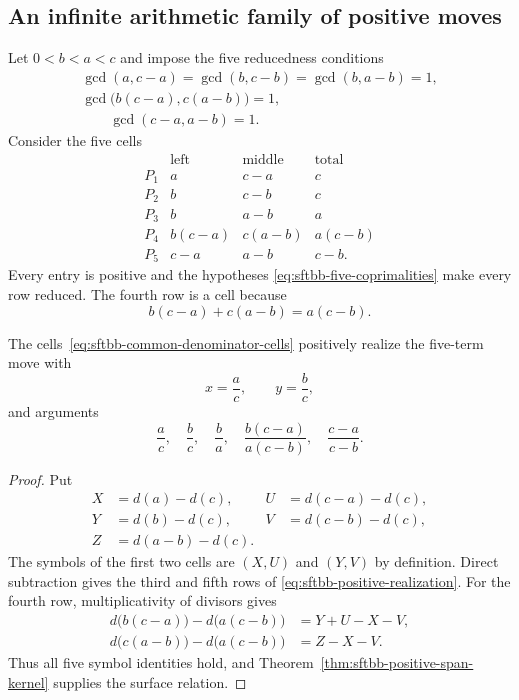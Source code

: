 \subsection{An infinite arithmetic family of positive moves}

Let $0<b<a<c$ and impose the five reducedness conditions
\begin{equation}
\begin{gathered}
 \gcd(a,c-a)=\gcd(b,c-b)=\gcd(b,a-b)=1,\\
 \gcd\bigl(b(c-a),c(a-b)\bigr)=1,\\
 \qquad \gcd(c-a,a-b)=1.
\end{gathered}
\label{eq:sftbb-five-coprimalities}
\end{equation}
Consider the five cells
\begin{equation}
\begin{array}{c|c|c|c}
 &\text{left}&\text{middle}&\text{total}\\ \hline
P_1&a&c-a&c\\
P_2&b&c-b&c\\
P_3&b&a-b&a\\
P_4&b(c-a)&c(a-b)&a(c-b)\\
P_5&c-a&a-b&c-b.
\end{array}
\label{eq:sftbb-common-denominator-cells}
\end{equation}
Every entry is positive and the hypotheses
\eqref{eq:sftbb-five-coprimalities} make every row reduced.  The fourth row
is a cell because
\[
 b(c-a)+c(a-b)=a(c-b).
\]

\begin{proposition}
\label{prop:sftbb-common-denominator}
The cells~\eqref{eq:sftbb-common-denominator-cells} positively realize the
five-term move with
\[
 x=\frac ac,\qquad y=\frac bc,
\]
and arguments
\begin{equation}
 \frac ac,\quad\frac bc,\quad\frac ba,\quad
 \frac{b(c-a)}{a(c-b)},\quad\frac{c-a}{c-b}.
 \label{eq:sftbb-five-rationals}
\end{equation}
\end{proposition}

\begin{proof}
Put
\[
\begin{aligned}
X&=d(a)-d(c),&U&=d(c-a)-d(c),\\
Y&=d(b)-d(c),&V&=d(c-b)-d(c),\\
Z&=d(a-b)-d(c).
\end{aligned}
\]
The symbols of the first two cells are $(X,U)$ and $(Y,V)$ by definition.
Direct subtraction gives the third and fifth rows of
\eqref{eq:sftbb-positive-realization}.  For the fourth row,
multiplicativity of divisors gives
\begin{align*}
d\bigl(b(c-a)\bigr)-d\bigl(a(c-b)\bigr)&=Y+U-X-V,\\
d\bigl(c(a-b)\bigr)-d\bigl(a(c-b)\bigr)&=Z-X-V.
\end{align*}
Thus all five symbol identities hold, and
Theorem~\ref{thm:sftbb-positive-span-kernel} supplies the surface relation.
\end{proof}

